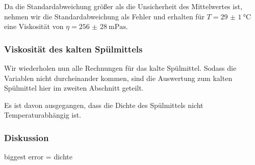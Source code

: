 		Da die Standardabweichung größer als die Unsicherheit des Mittelwertes ist, nehmen wir die Standardabweichung als Fehler und erhalten für $T = \SI{29(1)}{\celsius}$ eine Viskosität von $\eta = \SI{256(28)}{\milli\pascal\second}$.

	\subsubsection{Viskosität des kalten Spülmittels}
		Wir wiederholen nun alle Rechnungen für das kalte Spülmittel. Sodass die Variablen nicht durcheinander kommen, sind die Auswertung zum kalten Spülmittel hier im zweiten Abschnitt geteilt. 

		Es ist davon ausgegangen, dass die Dichte des Spülmittels nicht Temperaturabhängig ist.

		
		
	\subsubsection{Diskussion}
		biggest error = dichte
